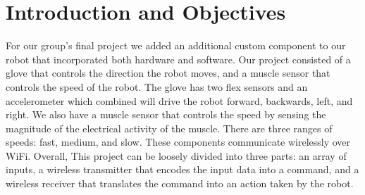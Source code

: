 \documentclass[12pt,scrartcl,titlepage]{article}
\begin{document}
\cfoot{\thepage}

{  }

\tableofcontents

\pagebreak


\section{Introduction and Objectives}

For our group's final project we added an additional custom component to our robot that incorporated both hardware and software. Our project consisted of a glove that controls  the direction the robot moves, and a muscle sensor that controls the speed of the robot. The glove has two flex sensors and an accelerometer which combined will drive the robot forward, backwards, left, and right. We also have a muscle sensor that controls the speed by sensing the magnitude of the electrical activity of the muscle. There are three ranges of speeds: fast, medium, and slow. These components communicate wirelessly over WiFi. Overall, This project can be loosely divided into three parts: an array of inputs, a wireless transmitter that encodes the input data into a command, and a wireless receiver that translates the command into an action taken by the robot.
\end{document}
